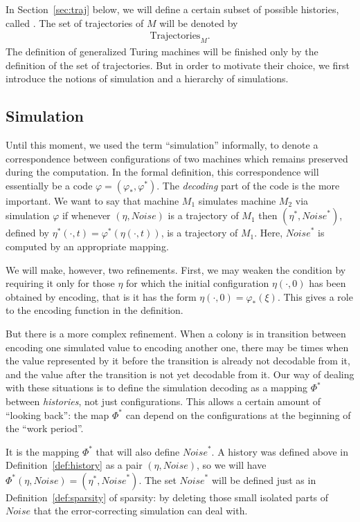 \documentclass[11pt]{memoir}
\theoremstyle{definition} %
\newcommand{\Noise}{\mathit{Noise}}
\newcommand{\Trajectories}{\mathrm{Trajectories}}
\begin{document}
In Section~\ref{sec:traj} below, we will define a certain subset of possible histories, called .
The set of trajectories of \( M \) will be denoted by
\begin{align*}
   \Trajectories_{M}.
 \end{align*}
 The definition of generalized Turing machines will be finished only by the definition of
 the set of  trajectories.
 But in order to motivate their choice, we first introduce the notions of simulation and
 a hierarchy of simulations.

 \subsection{Simulation}\label{sec:sim}


Until this moment, we used the term ``simulation'' informally, to denote
a correspondence between configurations of
two machines which remains preserved during the computation.
In the formal definition, this correspondence will essentially be a code
\( \varphi=(\varphi_{*},\varphi^{*}) \).
The \emph{decoding} part of the code is the more important.
We want to say that machine \( M_{1} \) simulates machine \( M_{2} \) via
simulation \( \varphi \) if whenever \( (\eta, \Noise) \) is a trajectory of \( M_{1} \) 
then \( (\eta^{*},\Noise^{*}) \),
defined by \( \eta^{*}(\cdot,t)=\varphi^{*}(\eta(\cdot,t)) \), is a
trajectory of \( M_{1} \).
Here, \( \Noise^{*} \) is computed by an appropriate mapping.

We will make, however, two refinements.
First, we may weaken the condition by requiring it only for
those \( \eta \) for which the initial configuration
 \( \eta(\cdot,0) \) has been obtained by encoding, that is it has the form 
\( \eta(\cdot,0)=\varphi_{*}(\xi) \).
This gives a role to the encoding function in the definition.

But there is a more complex refinement.
When a colony is in transition between encoding one simulated value to encoding another one,
there may be times when the value represented by it before the transition
is already not decodable from it, and the value after the transition is not yet decodable from it.
Our way of dealing with these situations is 
to define the simulation decoding as a mapping \( \Phi^{*} \)
between \emph{histories}, not just configurations.
This allows a certain amount of ``looking back'':
the map \( \Phi^{*} \) can depend on the configurations at the beginning of the ``work period''.

It is the mapping \( \Phi^{*} \) that will also define \( \Noise^{*} \).
A history was defined above in Definition~\ref{def:history} 
as a pair \( (\eta,\Noise) \), so we will have
\( \Phi^{*}(\eta,\Noise)=(\eta^{*},\Noise^{*}) \).
The set  \( \Noise^{*} \) will be defined just as in Definition~\ref{def:sparsity} of sparsity:
by deleting those small isolated parts of \( \Noise \) that the 
error-correcting simulation can deal with.
\end{document}
